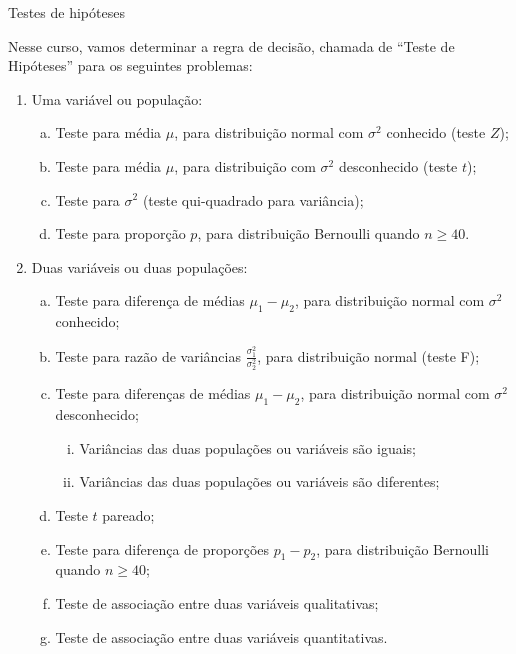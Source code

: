 \documentclass[8pt]{beamer}
\begin{document}
\begin{frame}{Testes de hipóteses}


Nesse curso, vamos determinar a regra de decisão, chamada de ``Teste de Hipóteses'' para os seguintes problemas:

\begin{enumerate}

	\item Uma variável ou população:
		\begin{enumerate}[a.]
			\item Teste  para média $\mu$, para distribuição normal com $\sigma^2$ conhecido (teste $Z$);
			\item Teste para média $\mu$, para distribuição com $\sigma^2$ desconhecido (teste $t$);
			\item Teste para $\sigma^2$ (teste qui-quadrado para variância);
			\item Teste para proporção $p$,  para distribuição Bernoulli quando $n \geq 40$.
		\end{enumerate}
	\vfill
	
	\item Duas variáveis ou duas populações:
	\begin{enumerate}[a.]
			\item Teste para diferença de médias $\mu_1 - \mu_2$, para distribuição normal com $\sigma^2$ conhecido;
		
		\item Teste para razão de variâncias $\frac{\sigma_1^2}{\sigma_2^2}$, para distribuição normal (teste F);
		
		\item Teste para diferenças de médias $\mu_1 - \mu_2$, para distribuição normal com $\sigma^2$ desconhecido;
		\begin{enumerate}[i.]
			\item Variâncias das duas populações ou variáveis são iguais;
			\item Variâncias das duas populações ou variáveis são diferentes;
		\end{enumerate}
		
		\item Teste $t$ pareado;
		
		\item Teste para diferença de proporções $p_1 - p_2$, para distribuição Bernoulli quando $n \geq 40$;
		
		\item Teste de associação entre duas variáveis qualitativas;
		
		\item Teste de associação entre duas variáveis quantitativas.
		
	\end{enumerate}
\end{enumerate}

 
\end{frame}
\end{document}
